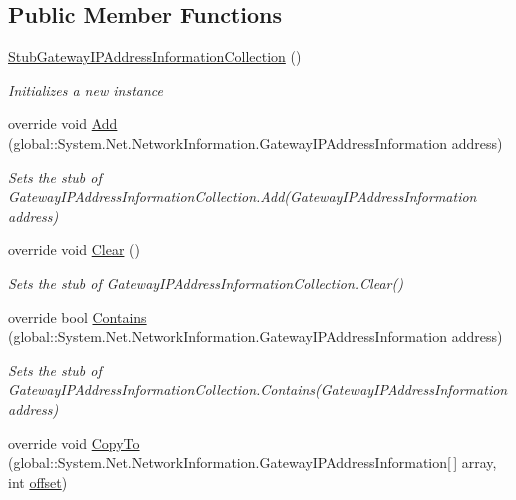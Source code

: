 \subsection*{Public Member Functions}
\begin{DoxyCompactItemize}
\item 
\hyperlink{class_system_1_1_net_1_1_network_information_1_1_fakes_1_1_stub_gateway_i_p_address_information_collection_a7becc348b89103d4b2d72e88e5d4e9dd}{Stub\-Gateway\-I\-P\-Address\-Information\-Collection} ()
\begin{DoxyCompactList}\small\item\em Initializes a new instance\end{DoxyCompactList}\item 
override void \hyperlink{class_system_1_1_net_1_1_network_information_1_1_fakes_1_1_stub_gateway_i_p_address_information_collection_a313be781313a0d298d9f234e4d5e1ef7}{Add} (global\-::\-System.\-Net.\-Network\-Information.\-Gateway\-I\-P\-Address\-Information address)
\begin{DoxyCompactList}\small\item\em Sets the stub of Gateway\-I\-P\-Address\-Information\-Collection.\-Add(\-Gateway\-I\-P\-Address\-Information address)\end{DoxyCompactList}\item 
override void \hyperlink{class_system_1_1_net_1_1_network_information_1_1_fakes_1_1_stub_gateway_i_p_address_information_collection_aef343359d74dd8ba7c22027045c65fc5}{Clear} ()
\begin{DoxyCompactList}\small\item\em Sets the stub of Gateway\-I\-P\-Address\-Information\-Collection.\-Clear()\end{DoxyCompactList}\item 
override bool \hyperlink{class_system_1_1_net_1_1_network_information_1_1_fakes_1_1_stub_gateway_i_p_address_information_collection_aa00e9dcfbef88c10b211929bc8ef3e17}{Contains} (global\-::\-System.\-Net.\-Network\-Information.\-Gateway\-I\-P\-Address\-Information address)
\begin{DoxyCompactList}\small\item\em Sets the stub of Gateway\-I\-P\-Address\-Information\-Collection.\-Contains(\-Gateway\-I\-P\-Address\-Information address)\end{DoxyCompactList}\item 
override void \hyperlink{class_system_1_1_net_1_1_network_information_1_1_fakes_1_1_stub_gateway_i_p_address_information_collection_a88454158893e1b8422bf68bdd9fa51a4}{Copy\-To} (global\-::\-System.\-Net.\-Network\-Information.\-Gateway\-I\-P\-Address\-Information\mbox{[}$\,$\mbox{]} array, int \hyperlink{jquery-1_810_82_8js_a4a9f594d20d927164551fc7fa4751a2f}{offset})

\end{DoxyCompactItemize}
